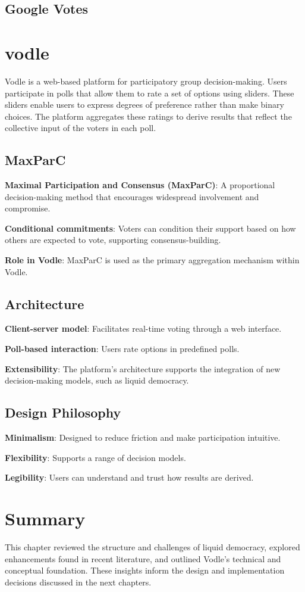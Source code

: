 \subsection{Google Votes}

\section{vodle}
Vodle is a web-based platform for participatory group decision-making. Users participate in polls that allow them to rate a set of options using sliders. These sliders enable users to express degrees of preference rather than make binary choices. The platform aggregates these ratings to derive results that reflect the collective input of the voters in each poll.

\subsection{MaxParC}

\textbf{Maximal Participation and Consensus (MaxParC)}: A proportional decision-making method that encourages widespread involvement and compromise.

\textbf{Conditional commitments}: Voters can condition their support based on how others are expected to vote, supporting consensus-building.

\textbf{Role in Vodle}: MaxParC is used as the primary aggregation mechanism within Vodle.

\subsection{Architecture}

\textbf{Client-server model}: Facilitates real-time voting through a web interface.

\textbf{Poll-based interaction}: Users rate options in predefined polls.

\textbf{Extensibility}: The platform's architecture supports the integration of new decision-making models, such as liquid democracy.

\subsection{Design Philosophy}

\textbf{Minimalism}: Designed to reduce friction and make participation intuitive.

\textbf{Flexibility}: Supports a range of decision models.

\textbf{Legibility}: Users can understand and trust how results are derived.

\section{Summary}
This chapter reviewed the structure and challenges of liquid democracy, explored enhancements found in recent literature, and outlined Vodle's technical and conceptual foundation. These insights inform the design and implementation decisions discussed in the next chapters.

